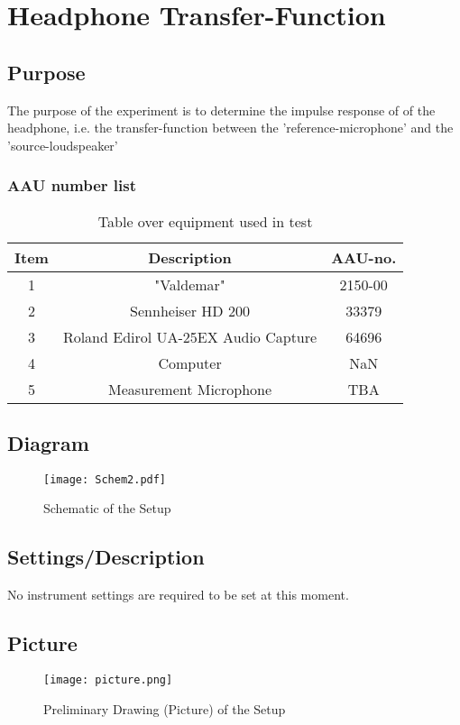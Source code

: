 \section{Headphone Transfer-Function}
\subsection{Purpose}
The purpose of the experiment is to determine the impulse response of of the  headphone, i.e. the transfer-function between the 'reference-microphone' and the 'source-loudspeaker'

\subsubsection{AAU number list}
\begin{table}[h]
	\centering
	\begin{tabular}{ c c c } \toprule
		{Item} & {Description} & {AAU-no.} \\ \bottomrule 
		1      &  "Valdemar"							& 2150-00	\\
		2      &  Sennheiser HD 200						& 33379		\\
		3      &  Roland Edirol UA-25EX Audio Capture	& 64696		\\
		4      &  Computer								& NaN		\\  
		5      &  Measurement Microphone				& TBA		\\ \bottomrule 
	\end{tabular}
	\caption{Table over equipment used in test}
	\label{tab:UsedEquipmentListning2}
\end{table}

\subsection{Diagram}
\begin{figure}[H]
	\centering
	\texttt{[image: Schem2.pdf]}
	\caption{Schematic of the Setup}
	\label{Schematic}
\end{figure}

\subsection{Settings/Description}
No instrument settings are required to be set at this moment.

\subsection{Picture}
\begin{figure}[H]
	\centering
	\texttt{[image: picture.png]}
	\caption{Preliminary Drawing (Picture) of the Setup}
	\label{PictureDrawing}
\end{figure}

